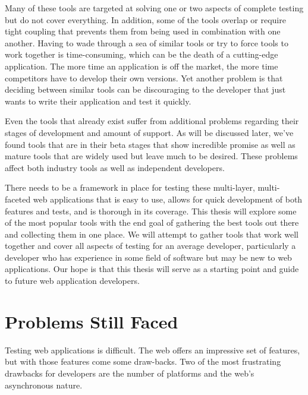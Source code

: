 \documentclass[12pt]{ucthesis}
\begin{document}
Many of these tools are targeted at solving one or two aspects of complete testing but do not cover everything. In addition, some of the tools overlap or require tight coupling that prevents them from being used in combination with one another. Having to wade through a sea of similar tools or try to force tools to work together is time-consuming, which can be the death of a cutting-edge application. The more time an application is off the market, the more time competitors have to develop their own versions. Yet another problem is that deciding between similar tools can be discouraging to the developer that just wants to write their application and test it quickly.

Even the tools that already exist suffer from additional problems regarding their stages of development and amount of support. As will be discussed later, we've found tools that are in their beta stages that show incredible promise as well as mature tools that are widely used but leave much to be desired. These problems affect both industry tools as well as independent developers.

There needs to be a framework in place for testing these multi-layer, multi-faceted web applications that is easy to use, allows for quick development of both features and tests, and is thorough in its coverage. This thesis will explore some of the most popular tools with the end goal of gathering the best tools out there and collecting them in one place. We will attempt to gather tools that work well together and cover all aspects of testing for an average developer, particularly a developer who has experience in some field of software but may be new to web applications. Our hope is that this thesis will serve as a starting point and guide to future web application developers.

\section{Problems Still Faced}
Testing web applications is difficult. The web offers an impressive set of features, but with those features come some draw-backs. Two of the most frustrating drawbacks for developers are the number of platforms and the web's asynchronous nature.
\end{document}
